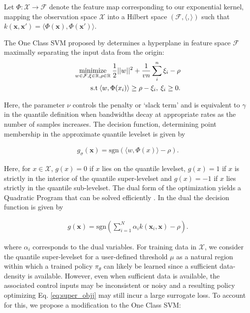 \documentclass[10pt, conference]{ieeeconf}      %
\newcommand{\bx}{\mathbf{x}}
\begin{document}
Let $\Phi:\mathcal{X}\to \mathcal{F}$ denote the feature map corresponding to our exponential kernel, mapping the
observation space $\mathcal{X}$ into a Hilbert space $(\mathcal{F}, \langle, \rangle)$ such that $k(\bx, \bx') = \langle
\Phi(\bx), \Phi(\bx')\rangle$.

The One Class SVM proposed by \cite{scholkopf2001estimating} determines a hyperplane in feature space $\mathcal{F}$
maximally separating the input data from the origin:
\vspace{-2ex}
\begin{align}\label{eq:primal_sup}
    \underset{w\in \mathcal{F}, \mathbf{\xi} \in \mathbb{R}, \rho \in \mathbb{R}}{\mbox{minimize}}\: \frac{1}{2}||w||^2+\frac{1}{vn} \sum^n_i \xi_i - \rho\\
\mbox{s.t} \: \langle w,\Phi(x_i) \rangle \geq \rho - \xi_i, \: \xi_i \geq 0 \notag.
\end{align}

Here, the parameter $\nu$ controls the penalty or `slack term' and is equivalent to $\gamma$ \cite{vert2006consistency}
in the quantile definition when bandwidths decay at appropriate rates as the number of samples increases. The decision
function, determining point membership in the approximate quantile levelset is given by

\vspace{-2ex}
\begin{align}\label{eq:decision_func}
g_{\sigma}(\bx) = \mbox{sgn}(\langle w,\Phi(x) \rangle-\rho).
\end{align}


Here, for $x\in \mathcal{X}$, $g(x)=0$ if $x$ lies on the quantile levelset,
$g(x) = 1$ if $x$ is strictly in the interior of the quantile super-levelset and $g(x) = -1$ 
if $x$ lies strictly in the quantile sub-levelset. The dual form of the optimization yields a Quadratic Program 
that can be solved efficiently \cite{scholkopf2001estimating}. In the dual the decision function is given by 

\vspace{-2ex}
\begin{align}\label{eq:decision_func}
g(\bx) = \mbox{sgn}(\sum^N_{i=1}\alpha_i k(\bx_i,\bx)-\rho).
\end{align}

where $\alpha_i$ corresponds to the dual variables.    For training data in $\mathcal{X}$, we consider the quantile super-levelset for a user-defined threshold $\mu$ as a natural region within which
a trained policy $\pi_{\theta}$ can likely be learned since a sufficient data-density is available.
However, even when sufficient data is available, the associated control inputs may be inconsistent or noisy and a resulting policy
optimizing Eq. \ref{eq:super_objj} may still incur a large surrogate loss. To account for this, we propose a
modification to the One Class SVM:
\end{document}
